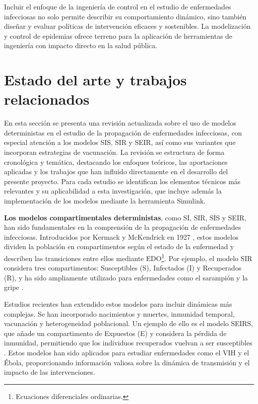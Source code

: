 Incluir el enfoque de la ingeniería de control en el estudio de enfermedades infecciosas no solo permite describir su comportamiento dinámico, sino también diseñar y evaluar políticas de intervención eficaces y sostenibles. La modelización y control de epidemias ofrece terreno para la aplicación de herramientas de ingeniería con impacto directo en la salud pública.

\section{Estado del arte y trabajos relacionados}
En esta sección se presenta una revisión actualizada sobre el uso de modelos deterministas en el estudio de la propagación de enfermedades infecciosas, con especial atención a los modelos SIS, SIR y SEIR, así como sus variantes que incorporan estrategias de vacunación. La revisión se estructura de forma cronológica y temática, destacando los enfoques teóricos, las aportaciones aplicadas y los trabajos que han influido directamente en el desarrollo del presente proyecto. Para cada estudio se identifican los elementos técnicos más relevantes y su aplicabilidad a esta investigación, que incluye además la implementación de los modelos mediante la herramienta Simulink.

\textbf{Los modelos compartimentales deterministas}, como SI, SIR, SIS y SEIR, han sido fundamentales en la comprensión de la propagación de enfermedades infecciosas. Introducidos por Kermack y McKendrick en 1927 \cite{brauer2005kermack}, estos modelos dividen la población en compartimentos según el estado de la enfermedad y describen las transiciones entre ellos mediante EDO\footnote{Ecuaciones diferenciales ordinarias.}. Por ejemplo, el modelo SIR considera tres compartimentos: Susceptibles (S), Infectados (I) y Recuperados (R), y ha sido ampliamente utilizado para enfermedades como el sarampión y la gripe \cite{carcione2020simulation}.

Estudios recientes han extendido estos modelos para incluir dinámicas más complejas. Se han incorporado nacimientos y muertes, inmunidad temporal, vacunación y heterogeneidad poblacional. Un ejemplo de ello es el modelo SEIRS, que añade un compartimento de Expuestos (E) y considera la pérdida de inmunidad, permitiendo que los individuos recuperados vuelvan a ser susceptibles \cite{trawicki2017deterministic}. Estos modelos han sido aplicados para estudiar enfermedades como el VIH y el Ébola, proporcionando información valiosa sobre la dinámica de transmisión y el impacto de las intervenciones.

